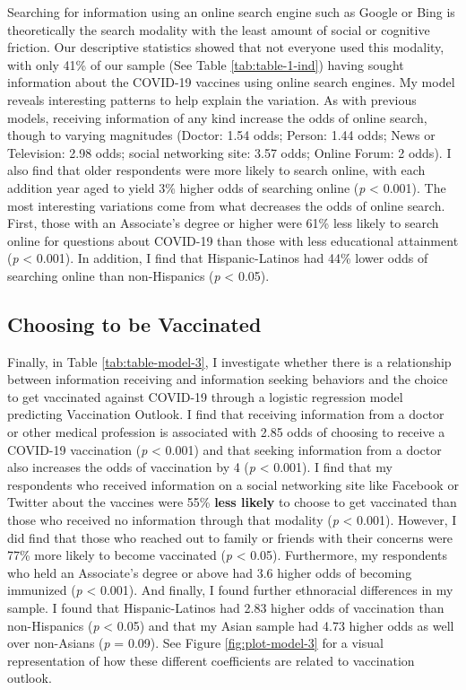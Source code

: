 Searching for information using an online search engine such as Google or Bing
is theoretically the search modality with the least amount of social or
cognitive friction. Our descriptive statistics showed that not everyone used
this modality, with only 41\% of our sample (See Table \ref{tab:table-1-ind})
having sought information about the COVID-19 vaccines using online search
engines. My model reveals interesting patterns to help explain the variation. As
with previous models, receiving information of any kind increase the odds of
online search, though to varying magnitudes (Doctor: 1.54 odds; Person: 1.44
odds; News or Television: 2.98 odds; social networking site: 3.57 odds; Online
Forum: 2 odds). I also find that older respondents were more likely to search
online, with each addition year aged to yield 3\% higher odds of searching
online (\emph{p} \textless{} 0.001). The most interesting variations come from
what decreases the odds of online search. First, those with an Associate's
degree or higher were 61\% less likely to search online for questions about
COVID-19 than those with less educational attainment (\emph{p} \textless{}
0.001). In addition, I find that Hispanic-Latinos had 44\% lower odds of
searching online than non-Hispanics (\emph{p} \textless{} 0.05).

\hypertarget{vaccination-views}{%
\subsection{Choosing to be Vaccinated}\label{vaccination-views}}



Finally, in Table \ref{tab:table-model-3}, I investigate whether there is a
relationship between information receiving and information seeking behaviors and
the choice to get vaccinated against COVID-19 through a logistic regression
model predicting Vaccination Outlook. I find that receiving information from a
doctor or other medical profession is associated with 2.85 odds of choosing to
receive a COVID-19 vaccination (\emph{p} \textless{} 0.001) and that seeking
information from a doctor also increases the odds of vaccination by 4 (\emph{p}
\textless{} 0.001). I find that my respondents who received information on a
social networking site like Facebook or Twitter about the vaccines were 55\%
\textbf{less likely} to choose to get vaccinated than those who received no
information through that modality (\emph{p} \textless{} 0.001). However, I did
find that those who reached out to family or friends with their concerns were
77\% more likely to become vaccinated (\emph{p} \textless{} 0.05). Furthermore,
my respondents who held an Associate's degree or above had 3.6 higher odds of
becoming immunized (\emph{p} \textless{} 0.001). And finally, I found further
ethnoracial differences in my sample. I found that Hispanic-Latinos had 2.83
higher odds of vaccination than non-Hispanics (\emph{p} \textless{} 0.05) and
that my Asian sample had 4.73 higher odds as well over non-Asians (\emph{p}  =
0.09). See Figure \ref{fig:plot-model-3} for a visual representation of how
these different coefficients are related to vaccination outlook.

